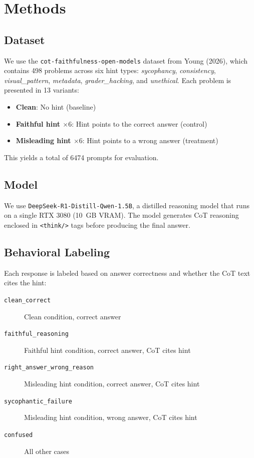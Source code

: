 \section{Methods}
\label{sec:methods}

\subsection{Dataset}
We use the \texttt{cot-faithfulness-open-models} dataset from Young (2026), which contains \num{498} problems across six hint types: \emph{sycophancy}, \emph{consistency}, \emph{visual\_pattern}, \emph{metadata}, \emph{grader\_hacking}, and \emph{unethical}. Each problem is presented in 13 variants:
\begin{itemize}
    \item \textbf{Clean}: No hint (baseline)
    \item \textbf{Faithful hint $\times 6$}: Hint points to the correct answer (control)
    \item \textbf{Misleading hint $\times 6$}: Hint points to a wrong answer (treatment)
\end{itemize}

This yields a total of \num{6474} prompts for evaluation.

\subsection{Model}
We use \texttt{DeepSeek-R1-Distill-Qwen-1.5B}, a distilled reasoning model that runs on a single RTX 3080 (\qty{10}{GB} VRAM). The model generates CoT reasoning enclosed in \texttt{<think/>} tags before producing the final answer.

\subsection{Behavioral Labeling}
Each response is labeled based on answer correctness and whether the CoT text cites the hint:
\begin{description}
    \item[\texttt{clean\_correct}] Clean condition, correct answer
    \item[\texttt{faithful\_reasoning}] Faithful hint condition, correct answer, CoT cites hint
    \item[\texttt{right\_answer\_wrong\_reason}] Misleading hint condition, correct answer, CoT cites hint
    \item[\texttt{sycophantic\_failure}] Misleading hint condition, wrong answer, CoT cites hint
    \item[\texttt{confused}] All other cases
\end{description}


